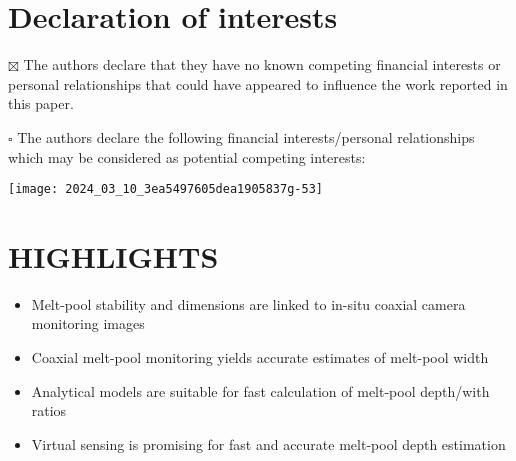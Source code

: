 \documentclass[10pt]{article}
\begin{document}
\section*{Declaration of interests}
$\boxtimes$ The authors declare that they have no known competing financial interests or personal relationships that could have appeared to influence the work reported in this paper.

$\square$ The authors declare the following financial interests/personal relationships which may be considered as potential competing interests:

\begin{center}
\texttt{[image: 2024\_03\_10\_3ea5497605dea1905837g-53]}
\end{center}

\section*{HIGHLIGHTS}
\begin{itemize}
  \item Melt-pool stability and dimensions are linked to in-situ coaxial camera monitoring images
  \item Coaxial melt-pool monitoring yields accurate estimates of melt-pool width
  \item Analytical models are suitable for fast calculation of melt-pool depth/with ratios
  \item Virtual sensing is promising for fast and accurate melt-pool depth estimation
\end{itemize}
\end{document}
